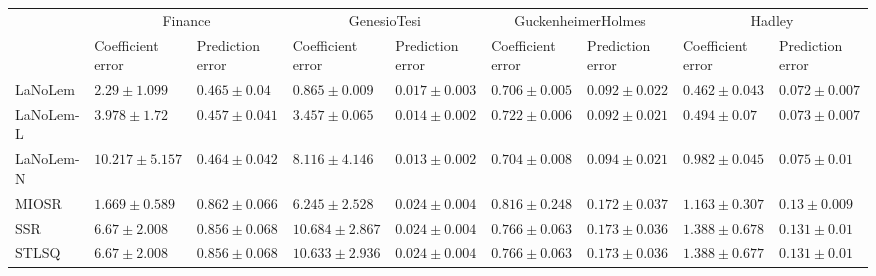 \begin{table*}
{\begin{tabular}{lllllllll}
 & \multicolumn{2}{c}{Finance} & \multicolumn{2}{c}{GenesioTesi} & \multicolumn{2}{c}{GuckenheimerHolmes} & \multicolumn{2}{c}{Hadley} \\
 & Coefficient error & Prediction error & Coefficient error & Prediction error & Coefficient error & Prediction error & Coefficient error & Prediction error \\
\midrule
LaNoLem & $2.29\pm 1.099$ & $0.465\pm 0.04$ & $\mathbf{0.865}\pm 0.009$ & $0.017\pm 0.003$ & $0.706\pm 0.005$ & $\mathbf{0.092}\pm 0.022$ & $\mathbf{0.462}\pm 0.043$ & $\mathbf{0.072}\pm 0.007$ \\
LaNoLem-L & $3.978\pm 1.72$ & $\mathbf{0.457}\pm 0.041$ & $3.457\pm 0.065$ & $0.014\pm 0.002$ & $0.722\pm 0.006$ & $0.092\pm 0.021$ & $0.494\pm 0.07$ & $0.073\pm 0.007$ \\
LaNoLem-N & $10.217\pm 5.157$ & $0.464\pm 0.042$ & $8.116\pm 4.146$ & $\mathbf{0.013}\pm 0.002$ & $\mathbf{0.704}\pm 0.008$ & $0.094\pm 0.021$ & $0.982\pm 0.045$ & $0.075\pm 0.01$ \\
MIOSR & $\mathbf{1.669}\pm 0.589$ & $0.862\pm 0.066$ & $6.245\pm 2.528$ & $0.024\pm 0.004$ & $0.816\pm 0.248$ & $0.172\pm 0.037$ & $1.163\pm 0.307$ & $0.13\pm 0.009$ \\
SSR & $6.67\pm 2.008$ & $0.856\pm 0.068$ & $10.684\pm 2.867$ & $0.024\pm 0.004$ & $0.766\pm 0.063$ & $0.173\pm 0.036$ & $1.388\pm 0.678$ & $0.131\pm 0.01$ \\
STLSQ & $6.67\pm 2.008$ & $0.856\pm 0.068$ & $10.633\pm 2.936$ & $0.024\pm 0.004$ & $0.766\pm 0.063$ & $0.173\pm 0.036$ & $1.388\pm 0.677$ & $0.131\pm 0.01$ \\

\midrule


\end{tabular}}
\end{table*}
